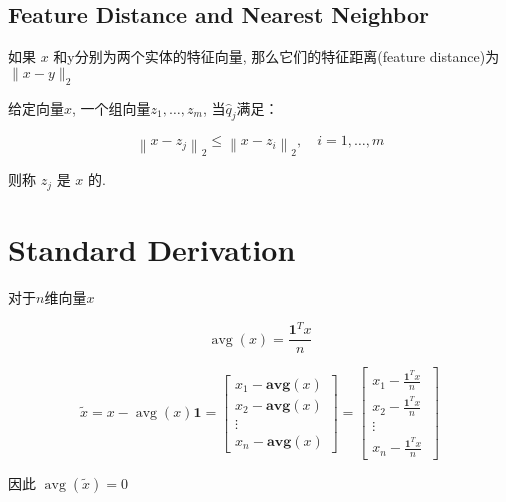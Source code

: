 \subsection{Feature Distance and Nearest Neighbor}

\begin{definition}
    如果 $ x $ 和y分别为两个实体的特征向量, 那么它们的特征距离(feature distance)为 $ \|x-y\|_{2} $
\end{definition}



\begin{definition}
    给定向量$x$, 一个组向量$ z_{1}, \ldots, z_{m} $, 当$ \hat{q}_{j} $满足：

    $$ \left\|x-z_{j}\right\|_{2} \leq\left\|x-z_{i}\right\|_{2}, \quad i=1, \ldots, m $$

    则称 $ z_{j} $ 是 $ x $ 的.
\end{definition}

\section{Standard Derivation}

\begin{definition}[算术平均值]
    对于$n$维向量$x$

    $$ \operatorname{avg}(x)=\frac{\mathbf{1}^{T} x}{n} $$
\end{definition}

\begin{definition}
    $$ \tilde{x}=x-\operatorname{avg}(x) \mathbf{1}\displaystyle =\left[\begin{array}{ c }
        x_{1} -\mathbf{avg} (x)\\
        x_{2} -\mathbf{avg} (x)\\
        \vdots \\
        x_{n} -\mathbf{avg} (x)
        \end{array}\right] =\left[\begin{array}{ c }
        x_{1} -\frac{\mathbf{1}^{T} x}{n} \ \\
        x_{2} -\frac{\mathbf{1}^{T} x}{n} \ \\
        \vdots \\
        x_{n} -\frac{\mathbf{1}^{T} x}{n} \ 
        \end{array}\right]$$

    因此 $ \operatorname{avg} (\tilde{x})=0 $
\end{definition}

